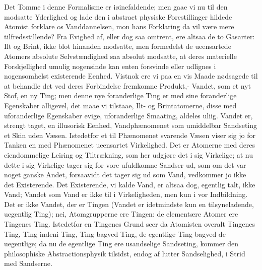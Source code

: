 \documentclass[12pt,a4paper]{book}
\begin{document}
Det Tomme i denne Formalisme er iøinefaldende; men
gaae vi nu til den modsatte Yderlighed og lade den i
abstract physiske Forestillinger hildede Atomist forklare os
Vanddannelsen, mon hans Forklaring da vil være mere
tilfredsstillende? Fra Evighed af, eller dog saa omtrent, ere altsaa
de to Gasarter: Ilt og Brint, ikke blot hinanden modsatte,
men formedelst de ueensartede Atomers absolute Selvstændighed
saa absolut modsatte, at deres materielle Forskjellighed
umulig nogensinde kan enten forsvinde eller udlignes i
nogensomhelst existerende Eenhed. Vistnok ere vi paa en vis Maade
nødsagede til at behandle det ved deres Forbindelse fremkomne
Produkt,- Vandet, som et nyt Stof, en ny Ting; men denne
nye foranderlige Ting er med sine foranderlige Egenskaber
alligevel, det maae vi tilstaae, Ilt- og Brintatomerne, disse
med uforanderlige Egenskaber evige, uforanderlige Smaating,
aldeles uliig. Vandet er, strengt taget, en illusorisk Eenhed,
Vandphænomenet som umiddelbar Sandseting et Skin uden
Væsen. Istedetfor et til Phænomenet svarende Væsen viser
sig jo for Tanken en med Phænomenet ueensartet Virkelighed.
Det er Atomerne med deres eiendommelige Leiring og
Tiltrækning, som her udgjøre det i sig Virkelige; at nu dette i
sig Virkelige tager sig for vore ufuldkomne Sandser ud, som
om det var noget ganske Andet, forsaavidt det tager sig
ud som Vand, vedkommer jo ikke det Existerende. Det
Existerende, vi kalde Vand, er altsaa dog, egentlig talt, ikke
Vand; Vandet som Vand er ikke til i Virkeligheden, men
kun i vor Indbildning. Det er ikke Vandet, der er Tingen
(Vandet er idetmindste kun en tilsyneladende, uegentlig Ting);
nei, Atomgrupperne ere Tingen: de elementære Atomer ere
Tingenes Ting. Istedetfor en Tingenes Grund seer da
Atomisten overalt Tingenes Ting, Ting indeni Ting, Ting
bagved Ting, de egentlige Ting bagved de uegentlige; da nu
de egentlige Ting ere usandselige Sandseting, kommer den
philosophiske Abstractionsphysik tilsidst, endog af lutter
Sandselighed, i Strid med Sandserne.
\end{document}
